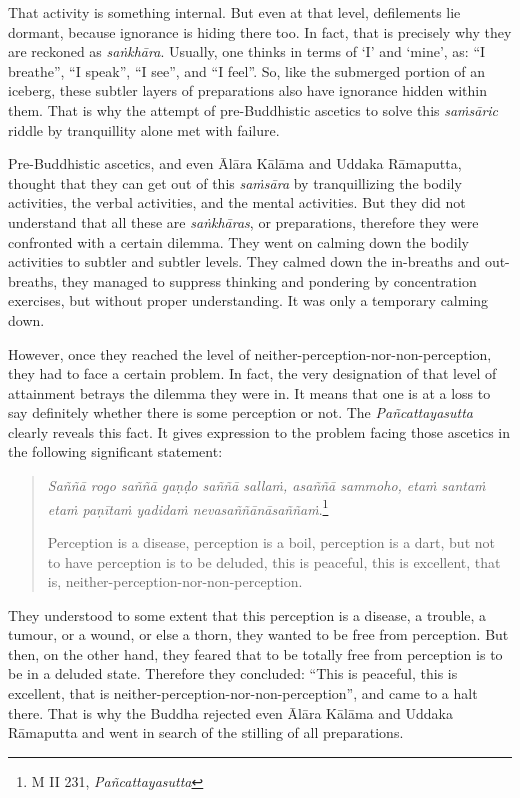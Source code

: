 That activity is something internal. But even at that level, defilements lie dormant, because ignorance is hiding there too. In fact, that is precisely why they are reckoned as \emph{saṅkhāra}. Usually, one thinks in terms of `I' and `mine', as: ``I breathe'', ``I speak'', ``I see'', and ``I feel''. So, like the submerged portion of an iceberg, these subtler layers of preparations also have ignorance hidden within them. That is why the attempt of pre-Buddhistic ascetics to solve this \emph{saṁsāric} riddle by tranquillity alone met with failure.

Pre-Buddhistic ascetics, and even Ālāra Kālāma and Uddaka Rāmaputta, thought that they can get out of this \emph{saṁsāra} by tranquillizing the bodily activities, the verbal activities, and the mental activities. But they did not understand that all these are \emph{saṅkhāras}, or preparations, therefore they were confronted with a certain dilemma. They went on calming down the bodily activities to subtler and subtler levels. They calmed down the in-breaths and out-breaths, they managed to suppress thinking and pondering by concentration exercises, but without proper understanding. It was only a temporary calming down.

However, once they reached the level of neither-perception-nor-non-perception, they had to face a certain problem. In fact, the very designation of that level of attainment betrays the dilemma they were in. It means that one is at a loss to say definitely whether there is some perception or not. The \emph{Pañcattayasutta} clearly reveals this fact. It gives expression to the problem facing those ascetics in the following significant statement:

\begin{quote}
\emph{Saññā rogo saññā gaṇḍo saññā sallaṁ, asaññā sammoho, etaṁ santaṁ etaṁ paṇītaṁ yadidaṁ nevasaññānāsaññaṁ}.\footnote{M II 231, \emph{Pañcattayasutta}}

Perception is a disease, perception is a boil, perception is a dart, but not to have perception is to be deluded, this is peaceful, this is excellent, that is, neither-perception-nor-non-perception.
\end{quote}

They understood to some extent that this perception is a disease, a trouble, a tumour, or a wound, or else a thorn, they wanted to be free from perception. But then, on the other hand, they feared that to be totally free from perception is to be in a deluded state. Therefore they concluded: ``This is peaceful, this is excellent, that is neither-perception-nor-non-perception'', and came to a halt there. That is why the Buddha rejected even Ālāra Kālāma and Uddaka Rāmaputta and went in search of the stilling of all preparations.

